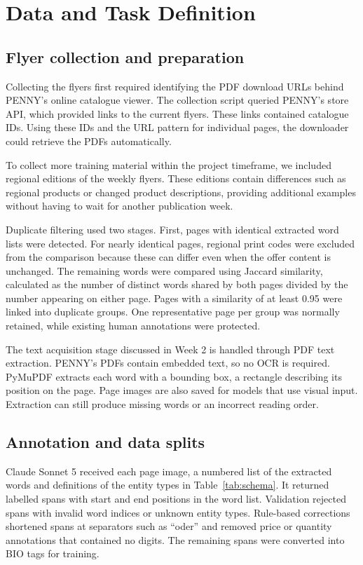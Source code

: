 \section{Data and Task Definition}\label{sec:data}
\subsection{Flyer collection and preparation}
Collecting the flyers first required identifying the PDF download URLs behind PENNY's online catalogue viewer. The collection script queried PENNY's store API, which provided links to the current flyers. These links contained catalogue IDs. Using these IDs and the URL pattern for individual pages, the downloader could retrieve the PDFs automatically.

To collect more training material within the project timeframe, we included regional editions of the weekly flyers. These editions contain differences such as regional products or changed product descriptions, providing additional examples without having to wait for another publication week.

Duplicate filtering used two stages. First, pages with identical extracted word lists were detected. For nearly identical pages, regional print codes were excluded from the comparison because these can differ even when the offer content is unchanged. The remaining words were compared using Jaccard similarity, calculated as the number of distinct words shared by both pages divided by the number appearing on either page. Pages with a similarity of at least 0.95 were linked into duplicate groups. One representative page per group was normally retained, while existing human annotations were protected.

The text acquisition stage discussed in Week 2 \citep[pp.~4--5]{iecourse2026} is handled through PDF text extraction. PENNY's PDFs contain embedded text, so no OCR is required. PyMuPDF extracts each word with a bounding box, a rectangle describing its position on the page. Page images are also saved for models that use visual input. Extraction can still produce missing words or an incorrect reading order.

\subsection{Annotation and data splits}
Claude Sonnet 5 received each page image, a numbered list of the extracted words and definitions of the entity types in Table~\ref{tab:schema}. It returned labelled spans with start and end positions in the word list. Validation rejected spans with invalid word indices or unknown entity types. Rule-based corrections shortened spans at separators such as ``oder'' and removed price or quantity annotations that contained no digits. The remaining spans were converted into BIO tags for training.

